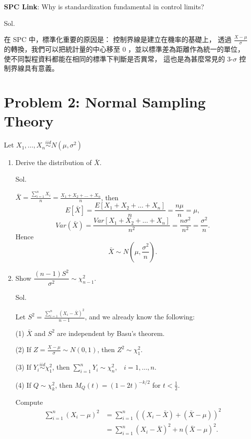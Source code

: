 \documentclass[a4paper, 12pt]{article}  %
\begin{document}
    \textbf{SPC Link}: Why is standardization fundamental in control limits?

    Sol.

    在 SPC 中，標準化重要的原因是：
    控制界線是建立在機率的基礎上，
    透過 $\frac{X-\mu}{\sigma}$ 的轉換，我們可以把統計量的中心移至 0 ，並以標準差為距離作為統一的單位，
    使不同製程資料都能在相同的標準下判斷是否異常，
    這也是為甚麼常見的 3-$\sigma$ 控制界線具有意義。

\section*{Problem 2: Normal Sampling Theory}
Let $X_1,\dots,X_n \stackrel{iid}{\sim} N(\mu,\sigma^2)$
    \begin{enumerate}
        \item Derive the distribution of $\bar{X}$.
        
        Sol.

        $\bar{X}=\frac{\sum_{i=1}^n X_i}{n}=\frac{X_1+X_2+\dots +X_n}{n}$, then 
        $$E[\bar{X}]=\frac{E[X_1+X_2+\dots +X_n]}{n}=\frac{n\mu}{n}=\mu,$$
        $$Var(\bar{X})=\frac{Var[X_1+X_2+\dots +X_n]}{n^2}=\frac{n\sigma^2}{n^2}=\frac{\sigma^2}{n}.$$
        Hence $$\bar{X}\sim N\left(\mu,\frac{\sigma^2}{n}\right).$$

        \item Show $\dfrac{(n-1)S^2}{\sigma^2} \sim \chi^2_{n-1}$.
        
        Sol.
        
        Let $S^2=\frac{\sum_{i=1}^n(X_i-\bar X)^2}{n-1}$, and we already know the following:

        (1) $\bar X$ and $S^2$ are independent by Basu's theorem.

        (2) If $Z=\frac{X-\mu}{\sigma}\sim N(0,1)$, then $Z^2\sim \chi^2_1$.
        
        (3) If $Y_i\stackrel{iid}{\sim}\chi^2_1$, then $\sum_{i=1}^n Y_i\sim \chi^2_n$,　$i=1,\dots,n$.
        
        (4) If $Q\sim \chi^2_k$, then $M_Q(t)=(1-2t)^{-k/2}$ for $t<\frac{1}{2}$.
        
        Compute
        \begin{align*}
        \sum_{i=1}^n (X_i-\mu)^2
        &=\sum_{i=1}^n((X_i-\bar X)+(\bar X-\mu))^2 \\
        &=\sum_{i=1}^n (X_i-\bar X)^2 + n(\bar X-\mu)^2.
        \end{align*}


\end{enumerate}
\end{document}
